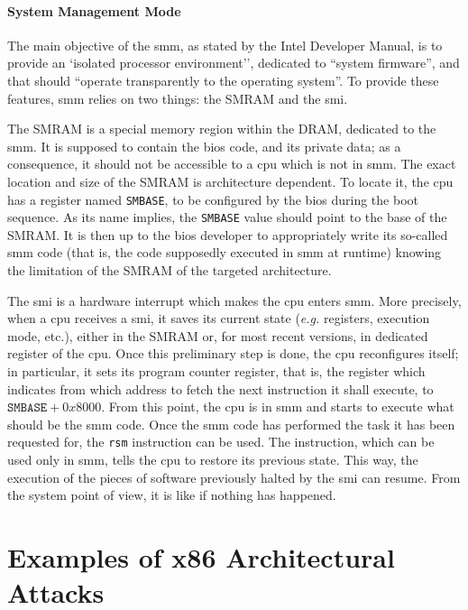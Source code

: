 \paragraph{System Management Mode}
%
The main objective of the \ac{smm}, as stated by the Intel Developer Manual, is
to provide an `isolated processor environment'', dedicated to ``system
firmware'', and that should ``operate transparently to the operating system''.
%
To provide these features, \ac{smm} relies on two things: the SMRAM and the
\ac{smi}.

The SMRAM is a special memory region within the DRAM, dedicated to the \ac{smm}.
%
It is supposed to contain the \ac{bios} code, and its private data;
%
as a consequence, it should not be accessible to a \ac{cpu} which is not in
\ac{smm}.
%
The exact location and size of the SMRAM is architecture dependent.
%
To locate it, the \ac{cpu} has a register named \texttt{SMBASE}, to be
configured by the \ac{bios} during the boot sequence.
%
As its name implies, the \texttt{SMBASE} value should point to the base of the
SMRAM.
%
It is then up to the \ac{bios} developer to appropriately write its so-called
\ac{smm} code (that is, the code supposedly executed in \ac{smm} at runtime)
knowing the limitation of the SMRAM of the targeted architecture.

The \ac{smi} is a hardware interrupt which makes the \ac{cpu} enters \ac{smm}.
%
More precisely, when a \ac{cpu} receives a \ac{smi}, it saves its current state
(\emph{e.g.} registers, execution mode, etc.), either in the SMRAM or, for most
recent versions, in dedicated register of the \ac{cpu}.
%
Once this preliminary step is done, the \ac{cpu} reconfigures itself;
%
in particular, it sets its program counter register, that is, the register which
indicates from which address to fetch the next instruction it shall execute, to
$\texttt{SMBASE} + 0x8000$.
%
From this point, the \ac{cpu} is in \ac{smm} and starts to execute what should
be the \ac{smm} code.
%
Once the \ac{smm} code has performed the task it has been requested for, the
\texttt{rsm} instruction can be used.
%
The instruction, which can be used only in \ac{smm}, tells the \ac{cpu} to
restore its previous state.
%
This way, the execution of the pieces of software previously halted by the
\ac{smi} can resume.
%
From the system point of view, it is like if nothing has happened.

\section{Examples of x86 Architectural Attacks}
\label{sec:usecase:hse}

